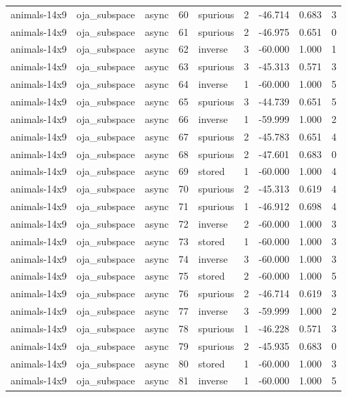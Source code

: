 \begin{tabular}{lllrlrrrr}
animals-14x9 & oja\_subspace & async & 60 & spurious & 2 & -46.714 & 0.683 & 3 \\
animals-14x9 & oja\_subspace & async & 61 & spurious & 2 & -46.975 & 0.651 & 0 \\
animals-14x9 & oja\_subspace & async & 62 & inverse & 3 & -60.000 & 1.000 & 1 \\
animals-14x9 & oja\_subspace & async & 63 & spurious & 3 & -45.313 & 0.571 & 3 \\
animals-14x9 & oja\_subspace & async & 64 & inverse & 1 & -60.000 & 1.000 & 5 \\
animals-14x9 & oja\_subspace & async & 65 & spurious & 3 & -44.739 & 0.651 & 5 \\
animals-14x9 & oja\_subspace & async & 66 & inverse & 1 & -59.999 & 1.000 & 2 \\
animals-14x9 & oja\_subspace & async & 67 & spurious & 2 & -45.783 & 0.651 & 4 \\
animals-14x9 & oja\_subspace & async & 68 & spurious & 2 & -47.601 & 0.683 & 0 \\
animals-14x9 & oja\_subspace & async & 69 & stored & 1 & -60.000 & 1.000 & 4 \\
animals-14x9 & oja\_subspace & async & 70 & spurious & 2 & -45.313 & 0.619 & 4 \\
animals-14x9 & oja\_subspace & async & 71 & spurious & 1 & -46.912 & 0.698 & 4 \\
animals-14x9 & oja\_subspace & async & 72 & inverse & 2 & -60.000 & 1.000 & 3 \\
animals-14x9 & oja\_subspace & async & 73 & stored & 1 & -60.000 & 1.000 & 3 \\
animals-14x9 & oja\_subspace & async & 74 & inverse & 3 & -60.000 & 1.000 & 3 \\
animals-14x9 & oja\_subspace & async & 75 & stored & 2 & -60.000 & 1.000 & 5 \\
animals-14x9 & oja\_subspace & async & 76 & spurious & 2 & -46.714 & 0.619 & 3 \\
animals-14x9 & oja\_subspace & async & 77 & inverse & 3 & -59.999 & 1.000 & 2 \\
animals-14x9 & oja\_subspace & async & 78 & spurious & 1 & -46.228 & 0.571 & 3 \\
animals-14x9 & oja\_subspace & async & 79 & spurious & 2 & -45.935 & 0.683 & 0 \\
animals-14x9 & oja\_subspace & async & 80 & stored & 1 & -60.000 & 1.000 & 3 \\
animals-14x9 & oja\_subspace & async & 81 & inverse & 1 & -60.000 & 1.000 & 5 \\

\end{tabular}
